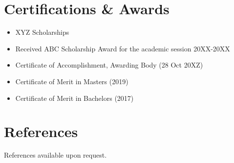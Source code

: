 \documentclass[11pt]{article}
\begin{document}
    \section{Certifications \& Awards}
    \begin{itemize}
        \item[\checkmark] XYZ Scholarships
        \item[\checkmark] Received ABC Scholarship Award for the academic session 20XX-20XX
        \item[\checkmark] Certificate of Accomplishment, Awarding Body (28 Oct 20XZ)
        \item[\checkmark] Certificate of Merit in Masters (2019)
        \item[\checkmark] Certificate of Merit in Bachelors (2017)
    \end{itemize}
    \section{References}
    \textcolor{Sepia}{References available upon request.}
    
\end{document}
